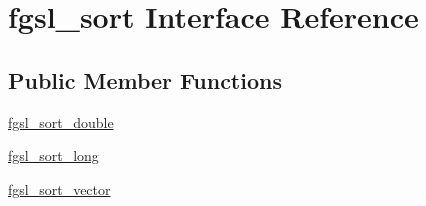 \hypertarget{interfacefgsl__sort}{\section{fgsl\-\_\-sort Interface Reference}
\label{interfacefgsl__sort}
}
\subsection*{Public Member Functions}
\begin{DoxyCompactItemize}
\item 
\hyperlink{interfacefgsl__sort_ac96868ba62ebd24850db17233635e2d1}{fgsl\-\_\-sort\-\_\-double}
\item 
\hyperlink{interfacefgsl__sort_a8d415eb7f84ee09c405d8de68a6233a9}{fgsl\-\_\-sort\-\_\-long}
\item 
\hyperlink{interfacefgsl__sort_a39a5b97ec7630f6c5f38f028e1aab311}{fgsl\-\_\-sort\-\_\-vector}
\end{DoxyCompactItemize}


